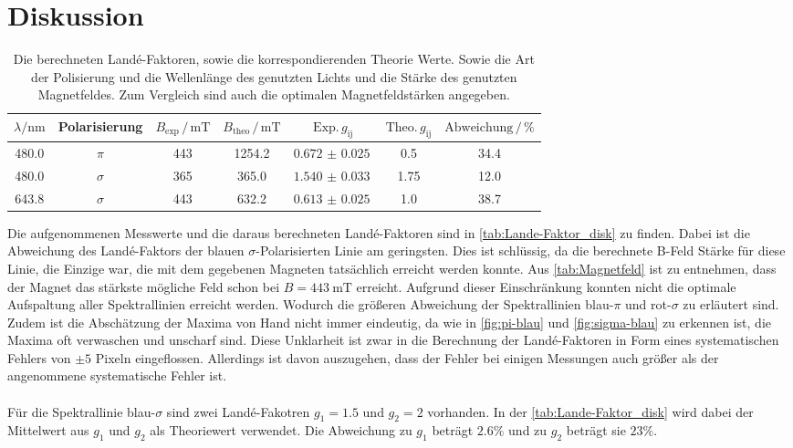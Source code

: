 \section{Diskussion}
\label{sec:Diskussion}
\begin{table}
    \centering
    \caption{Die berechneten Landé-Faktoren, sowie die korrespondierenden Theorie Werte. Sowie die Art der Polisierung und die Wellenlänge des genutzten Lichts und die Stärke des genutzten Magnetfeldes. Zum Vergleich sind auch die optimalen Magnetfeldstärken angegeben.}
    \begin{tabular}{ccccccc}
        \toprule
        $\lambda / \si{\nano\meter}$ & Polarisierung & $B_\text{exp} \, /\, \si{\milli\tesla}$ &$B_\text{theo} \,/ \,\si{\milli\tesla}$& $\text{Exp.}\,g_\text{ij}$ & $\text{Theo.}\, g _\text{ij}$ & $\text{Abweichung}\,/\,\%$\\
        \midrule
        480.0 & $\pi$    & 443 &  1254.2& $\SI{0.672(25)}{}$  & 0.5   &   34.4\\
        480.0 & $\sigma$ & 365 &  365.0 & $\SI{1.540(33)}{}$  & 1.75  &    12.0\\
        643.8 & $\sigma$ & 443 &  632.2 & $\SI{0.613(25)}{}$  & 1.0   &   38.7\\
        \bottomrule
    \end{tabular}
    \label{tab:Lande-Faktor_disk}
\end{table}
Die aufgenommenen Messwerte und die daraus berechneten Landé-Faktoren sind in \autoref{tab:Lande-Faktor_disk} zu finden.
Dabei ist die Abweichung des Landé-Faktors der blauen $\sigma$-Polarisierten Linie am geringsten.
Dies ist schlüssig, da die berechnete B-Feld Stärke für diese Linie, die Einzige war, die mit dem gegebenen Magneten tatsächlich erreicht werden konnte.
Aus \autoref{tab:Magnetfeld} ist zu entnehmen, dass der Magnet das stärkste mögliche Feld schon bei $B = \SI{443}{\milli\tesla}$ erreicht.
Aufgrund dieser Einschränkung konnten nicht die optimale Aufspaltung aller Spektrallinien erreicht werden.
Wodurch die größeren Abweichung der Spektrallinien blau-$\pi$ und rot-$\sigma$ zu erläutert sind.
Zudem ist die Abschätzung der Maxima von Hand nicht immer eindeutig, da wie in \autoref{fig:pi-blau} und \autoref{fig:sigma-blau} zu erkennen ist, die Maxima oft verwaschen und unscharf sind.
Diese Unklarheit ist zwar in die Berechnung der Landé-Faktoren in Form eines systematischen Fehlers von $\pm 5$ Pixeln eingeflossen.
Allerdings ist davon auszugehen, dass der Fehler bei einigen Messungen auch größer als der angenommene systematische Fehler ist.
\\\\
Für die Spektrallinie blau-$\sigma$ sind zwei Landé-Fakotren $g_1 = 1.5$ und $g_2 = 2$ vorhanden.
In der \autoref{tab:Lande-Faktor_disk} wird dabei der Mittelwert aus $g_1$ und $g_2$ als Theoriewert verwendet.
Die Abweichung zu $g_1$ beträgt $2.6\%$ und zu $g_2$ beträgt sie $23\%$.
